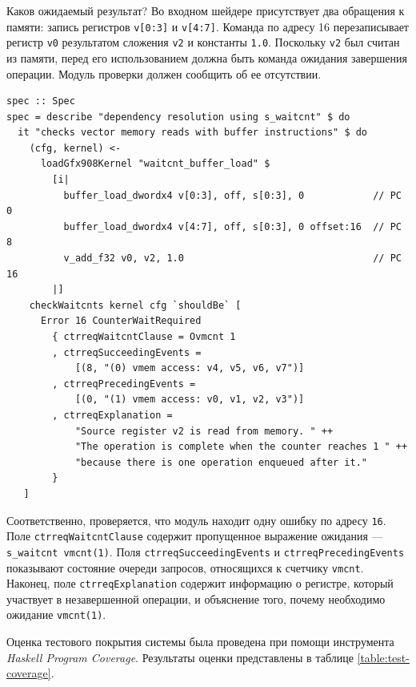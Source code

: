\documentclass[a4paper,14pt]{extarticle}
\begin{document}
{Каков ожидаемый результат? Во входном шейдере присутствует два
обращения к памяти: запись регистров \verb|v[0:3]| и \verb|v[4:7]|.
Команда по адресу 16 перезаписывает регистр \verb|v0| результатом сложения
\verb|v2| и константы \verb|1.0|. Поскольку \verb|v2| был считан из памяти,
перед его использованием должна быть команда ожидания завершения операции.
Модуль проверки должен сообщить об ее отсутствии.

\begin{verbatim}
spec :: Spec
spec = describe "dependency resolution using s_waitcnt" $ do
  it "checks vector memory reads with buffer instructions" $ do
    (cfg, kernel) <-
      loadGfx908Kernel "waitcnt_buffer_load" $
        [i|
          buffer_load_dwordx4 v[0:3], off, s[0:3], 0            // PC 0
          buffer_load_dwordx4 v[4:7], off, s[0:3], 0 offset:16  // PC 8
          v_add_f32 v0, v2, 1.0                                 // PC 16
        |]
    checkWaitcnts kernel cfg `shouldBe` [
      Error 16 CounterWaitRequired
        { ctrreqWaitcntClause = Ovmcnt 1
        , ctrreqSucceedingEvents =
            [(8, "(0) vmem access: v4, v5, v6, v7")]
        , ctrreqPrecedingEvents =
            [(0, "(1) vmem access: v0, v1, v2, v3")]
        , ctrreqExplanation =
            "Source register v2 is read from memory. " ++
            "The operation is complete when the counter reaches 1 " ++
            "because there is one operation enqueued after it."
        }
   ]
\end{verbatim}

Соответственно, проверяется, что модуль находит одну ошибку по адресу \verb|16|.
Поле \verb|ctrreqWaitcntClause| содержит пропущенное выражение ожидания —
\verb|s_waitcnt vmcnt(1)|. Поля \verb|ctrreqSucceedingEvents|
и \verb|ctrreqPrecedingEvents| показывают состояние очереди запросов, относящихся
к счетчику \verb|vmcnt|. Наконец, поле \verb|ctrreqExplanation| содержит информацию
о регистре, который участвует в незавершенной операции, и объяснение того, почему
необходимо ожидание \verb|vmcnt(1)|.

Оценка тестового покрытия системы была проведена при помощи инструмента
\textit{Haskell Program Coverage}. Результаты оценки представлены в таблице \ref{table:test-coverage}.

}
\end{document}
